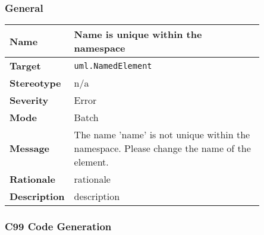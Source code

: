 \documentclass{template/openetcs_article}
\begin{document}
\subsubsection{General}

\begin{longtable}{|l||>{\raggedright}p{0.85\linewidth}|}
  \hline
  \textbf{Name}        &  Name is unique within the namespace \tabularnewline \hline
  \textbf{Target}      &  \texttt{uml.NamedElement} \tabularnewline \hline
  \textbf{Stereotype}  &  n/a \tabularnewline \hline
  \textbf{Severity}    &  Error \tabularnewline \hline
  \textbf{Mode}        &  Batch \tabularnewline \hline
  \textbf{Message}     &  The name 'name' is not unique within the namespace. Please change the name of
                          the element. \tabularnewline \hline
  \textbf{Rationale}   &  rationale \tabularnewline \hline
  \textbf{Description} &  description \tabularnewline \hline
\end{longtable}



\subsubsection{C99 Code Generation}
\end{document}
